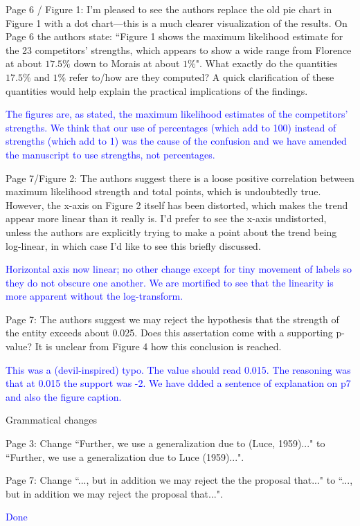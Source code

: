 \documentclass[12pt]{article}
\begin{document}
Page 6 / Figure 1: I'm pleased to see the authors replace the old pie
chart in Figure 1 with a dot chart---this is a much clearer
visualization of the results.  On Page 6 the authors state: ``Figure 1
shows the maximum likelihood estimate for the 23 competitors'
strengths, which appears to show a wide range from Florence at about
$17.5\%$ down to Morais at about $1\%$". What exactly do the
quantities $17.5\%$ and $1\%$ refer to/how are they computed? A quick
clarification of these quantities would help explain the practical
implications of the findings.

\textcolor{blue}{The figures are, as stated, the maximum likelihood
  estimates of the competitors' strengths.  We think that our use of
  percentages (which add to 100) instead of strengths (which add to 1)
  was the cause of the confusion and we have amended the manuscript to
  use strengths, not percentages.}

Page 7/Figure 2: The authors suggest there is a loose positive
correlation between maximum likelihood strength and total points,
which is undoubtedly true. However, the x-axis on Figure 2 itself has
been distorted, which makes the trend appear more linear than it
really is. I'd prefer to see the x-axis undistorted, unless the
authors are explicitly trying to make a point about the trend being
log-linear, in which case I'd like to see this briefly discussed.

\textcolor{blue}{Horizontal axis now linear; no other change except
  for tiny movement of labels so they do not obscure one another.  We
  are mortified to see that the linearity is more apparent without the
  log-transform.}

Page 7: The authors suggest we may reject the hypothesis that the
strength of the entity exceeds about 0.025. Does this assertation come
with a supporting p-value? It is unclear from Figure 4 how this
conclusion is reached.

\textcolor{blue}{This was a (devil-inspired) typo.  The value should
  read 0.015.  The reasoning was that at 0.015 the support was -2.  We
  have ddded a sentence of explanation on p7 and also the figure
  caption.}


Grammatical changes

Page 3: Change ``Further, we use a generalization due to (Luce,
1959)..." to ``Further, we use a generalization due to Luce
(1959)...".

Page 7: Change ``..., but in addition we may reject the
the proposal that..." to ``..., but in addition we may reject the
proposal that...".

\textcolor{blue}{Done}
\end{document}
